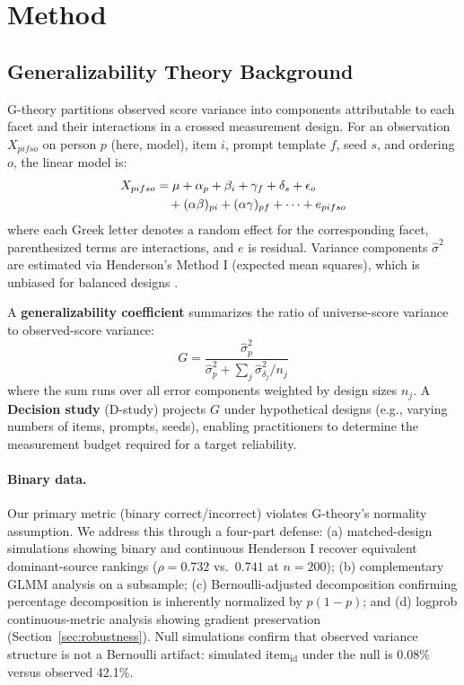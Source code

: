 \documentclass[letterpaper,11pt]{article}
\begin{document}
\section{Method}

\subsection{Generalizability Theory Background}

G-theory \citep{shavelson1991generalizability,brennan2001generalizability} partitions observed score variance into components attributable to each facet and their interactions in a crossed measurement design.
For an observation $X_{pifso}$ on person $p$ (here, model), item $i$, prompt template $f$, seed $s$, and ordering $o$, the linear model is:
\begin{align}
X_{pifso} &= \mu + \alpha_p + \beta_i + \gamma_f + \delta_s + \epsilon_o \notag\\
&\quad + (\alpha\beta)_{pi} + (\alpha\gamma)_{pf} + \cdots + e_{pifso}
\label{eq:gtheory}
\end{align}
where each Greek letter denotes a random effect for the corresponding facet, parenthesized terms are interactions, and $e$ is residual.
Variance components $\hat{\sigma}^2$ are estimated via Henderson's Method I (expected mean squares), which is unbiased for balanced designs \citep{brennan2001generalizability}.

A \textbf{generalizability coefficient} summarizes the ratio of universe-score variance to observed-score variance:
\begin{equation}
G = \frac{\hat{\sigma}^2_p}{\hat{\sigma}^2_p + \sum_j \hat{\sigma}^2_{\delta_j}/n_j}
\label{eq:gcoeff}
\end{equation}
where the sum runs over all error components weighted by design sizes $n_j$.
A \textbf{Decision study} (D-study) projects $G$ under hypothetical designs (e.g., varying numbers of items, prompts, seeds), enabling practitioners to determine the measurement budget required for a target reliability.

\paragraph{Binary data.}
Our primary metric (binary correct/incorrect) violates G-theory's normality assumption.
We address this through a four-part defense: (a) matched-design simulations showing binary and continuous Henderson I recover equivalent dominant-source rankings ($\rho=0.732$ vs.\ $0.741$ at $n=200$); (b) complementary GLMM analysis on a subsample; (c) Bernoulli-adjusted decomposition confirming percentage decomposition is inherently normalized by $p(1-p)$; and (d) logprob continuous-metric analysis showing gradient preservation (Section~\ref{sec:robustness}).
Null simulations confirm that observed variance structure is not a Bernoulli artifact: simulated item$_{\text{id}}$ under the null is 0.08\% versus observed 42.1\%.
\end{document}
